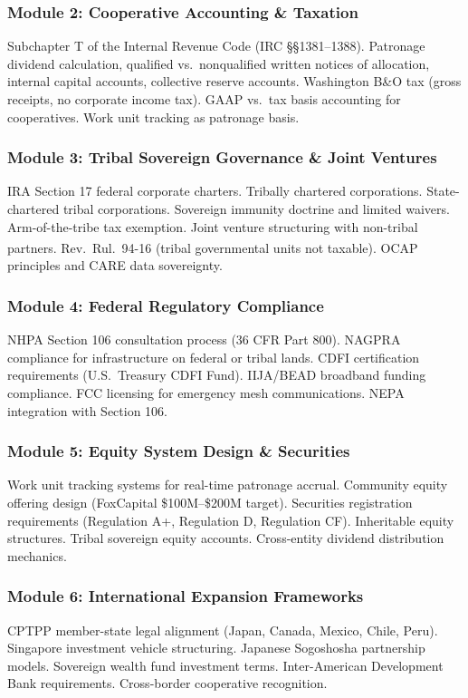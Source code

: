 \documentclass[11pt,letterpaper]{article}
\begin{document}
\subsubsection{Module 2: Cooperative Accounting \& Taxation}
Subchapter T of the Internal Revenue Code (IRC \S\S 1381--1388). Patronage dividend calculation, qualified vs.\ nonqualified written notices of allocation, internal capital accounts, collective reserve accounts. Washington B\&O tax (gross receipts, no corporate income tax). GAAP vs.\ tax basis accounting for cooperatives. Work unit tracking as patronage basis.

\subsubsection{Module 3: Tribal Sovereign Governance \& Joint Ventures}
IRA Section 17 federal corporate charters. Tribally chartered corporations. State-chartered tribal corporations. Sovereign immunity doctrine and limited waivers. Arm-of-the-tribe tax exemption. Joint venture structuring with non-tribal partners. Rev.\ Rul.\ 94-16 (tribal governmental units not taxable). OCAP\textsuperscript{\textregistered} principles and CARE data sovereignty.

\subsubsection{Module 4: Federal Regulatory Compliance}
NHPA Section 106 consultation process (36 CFR Part 800). NAGPRA compliance for infrastructure on federal or tribal lands. CDFI certification requirements (U.S.\ Treasury CDFI Fund). IIJA/BEAD broadband funding compliance. FCC licensing for emergency mesh communications. NEPA integration with Section 106.

\subsubsection{Module 5: Equity System Design \& Securities}
Work unit tracking systems for real-time patronage accrual. Community equity offering design (FoxCapital \$100M--\$200M target). Securities registration requirements (Regulation A+, Regulation D, Regulation CF). Inheritable equity structures. Tribal sovereign equity accounts. Cross-entity dividend distribution mechanics.

\subsubsection{Module 6: International Expansion Frameworks}
CPTPP member-state legal alignment (Japan, Canada, Mexico, Chile, Peru). Singapore investment vehicle structuring. Japanese Sogoshosha partnership models. Sovereign wealth fund investment terms. Inter-American Development Bank requirements. Cross-border cooperative recognition.
\end{document}
